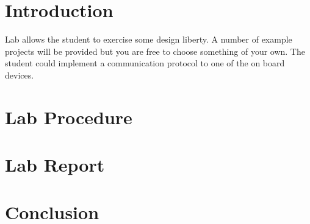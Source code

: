 \newcommand{\TITLE}{Lab Six: Special Projects}
\newcommand{\KEYWORDS}{Logic Gates, Verilog, FPGA, Signaltap, Synthesis}
\newcommand{\ABSTRACT}{Two input logic gates are synthesized for the Altera Cyclone IV FPGA using the Quartus IDE. The logic gates are verified using a System Verilog testbench and Mentor's Modelsim HDL simulator}



  \section{\bfseries Introduction}
     Lab allows the student to exercise some design liberty. A number of example projects will be provided but you are free to choose something of your own. The student could implement a communication protocol to one of the on board devices.

  \section{\bfseries Lab Procedure}
    
  \section{\bfseries  Lab Report}
    
  \section{\bfseries  Conclusion}
   
